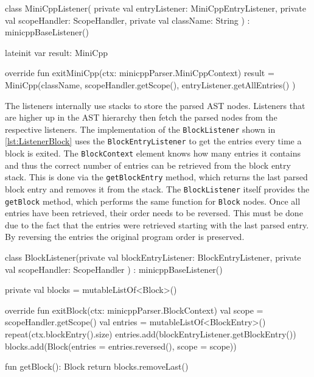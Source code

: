 \begin{KotlinCode}[float,numbers=none,caption=Implementation of the \texttt{MiniCppListener} class., label=lst:ListenerMiniCpp]
class MiniCppListener(
    private val entryListener: MiniCppEntryListener,
    private val scopeHandler: ScopeHandler,
    private val className: String
) : minicppBaseListener() {

    lateinit var result: MiniCpp

    override fun exitMiniCpp(ctx: minicppParser.MiniCppContext) {
        result = MiniCpp(className, 
                         scopeHandler.getScope(), 
                         entryListener.getAllEntries()
                         )
    }
}
\end{KotlinCode}

The listeners internally use stacks to store the parsed AST nodes. Listeners that are higher up in the AST hierarchy then fetch the parsed nodes from the respective listeners. The implementation of the \verb|BlockListener| shown in \ref{lst:ListenerBlock} uses the \verb|BlockEntryListener| to get the entries every time a block is exited. The \verb|BlockContext| element knows how many entries it contains and thus the correct number of entries can be retrieved from the block entry stack. This is done via the \verb|getBlockEntry| method, which returns the last parsed block entry and removes it from the stack. The \verb|BlockListener| itself provides the \verb|getBlock| method, which performs the same function for \verb|Block| nodes. Once all entries have been retrieved, their order needs to be reversed. This must be done due to the fact that the entries were retrieved starting with the last parsed entry. By reversing the entries the original program order is preserved. 


\begin{KotlinCode}[float,numbers=none,caption=Implementation of the \texttt{BlockListener} class., label=lst:ListenerBlock]
class BlockListener(private val blockEntryListener: BlockEntryListener,
    private val scopeHandler: ScopeHandler
) : minicppBaseListener() {

    private val blocks = mutableListOf<Block>()
    
    override fun exitBlock(ctx: minicppParser.BlockContext) {
        val scope = scopeHandler.getScope()
        val entries = mutableListOf<BlockEntry>()
        repeat(ctx.blockEntry().size) {
            entries.add(blockEntryListener.getBlockEntry())
        }
        blocks.add(Block(entries = entries.reversed(), scope = scope))
    }
    
    fun getBlock(): Block {
        return blocks.removeLast()
}
}
    \end{KotlinCode}


